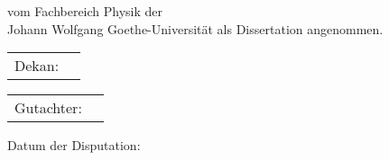 \thispagestyle{empty}

\vspace*{0.5\textheight}

\noindent{}%
vom Fachbereich Physik der \\[2pt]
Johann Wolfgang Goethe-Universit\"at als Dissertation angenommen.

\vspace*{2cm}

\noindent{}%
\begin{tabular}{@{}l@{\hskip 1ex}l}
  Dekan:
\end{tabular}

\vspace*{1cm}

\noindent{}%
\begin{tabular}{@{}l@{\hskip 1ex}l}
  Gutachter: 
\end{tabular}

\vspace*{2cm}
\noindent{}%
Datum der Disputation: